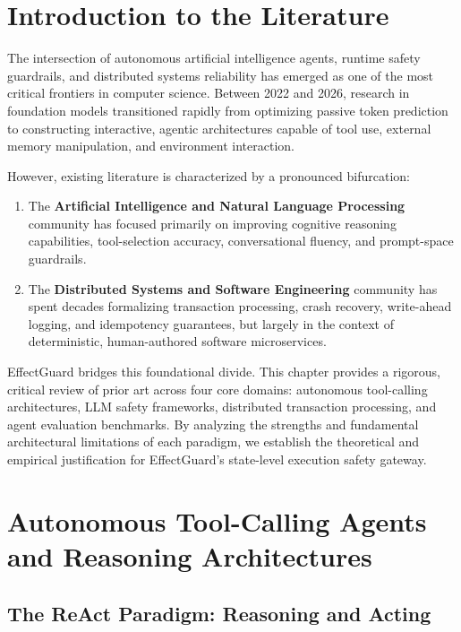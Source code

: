 
\section{Introduction to the Literature}

The intersection of autonomous artificial intelligence agents, runtime safety guardrails, and distributed systems reliability has emerged as one of the most critical frontiers in computer science. Between 2022 and 2026, research in foundation models transitioned rapidly from optimizing passive token prediction to constructing interactive, agentic architectures capable of tool use, external memory manipulation, and environment interaction. 

However, existing literature is characterized by a pronounced bifurcation:
\begin{enumerate}
    \item The \textbf{Artificial Intelligence and Natural Language Processing} community has focused primarily on improving cognitive reasoning capabilities, tool-selection accuracy, conversational fluency, and prompt-space guardrails.
    \item The \textbf{Distributed Systems and Software Engineering} community has spent decades formalizing transaction processing, crash recovery, write-ahead logging, and idempotency guarantees, but largely in the context of deterministic, human-authored software microservices.
\end{enumerate}

EffectGuard bridges this foundational divide. This chapter provides a rigorous, critical review of prior art across four core domains: autonomous tool-calling architectures, LLM safety frameworks, distributed transaction processing, and agent evaluation benchmarks. By analyzing the strengths and fundamental architectural limitations of each paradigm, we establish the theoretical and empirical justification for EffectGuard's state-level execution safety gateway.

\section{Autonomous Tool-Calling Agents and Reasoning Architectures}

\subsection{The ReAct Paradigm: Reasoning and Acting}

